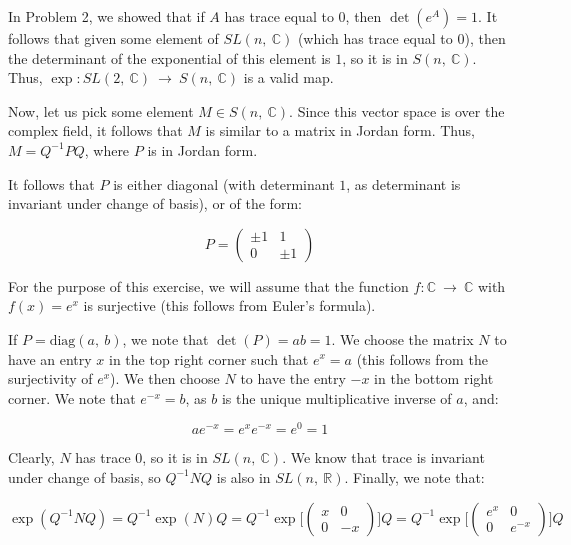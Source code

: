 \documentclass[10pt, oneside]{article}
\begin{document}
    In Problem 2, we showed that if $A$ has trace equal to $0$, then $\det(e^A) = 1$. It follows that given some element of $SL(n, \ \mathbb{C})$ (which has trace equal to $0$), then
    the determinant of the exponential of this element is $1$, so it is in $S(n, \ \mathbb{C})$. Thus, $\exp : SL(2, \ \mathbb{C}) \ \rightarrow \ S(n, \ \mathbb{C})$ is a valid map.
    \newline

    Now, let us pick some element $M \in S(n, \ \mathbb{C})$. Since this vector space is over the complex field, it follows that $M$ is similar to a matrix in Jordan form. Thus,
    $M = Q^{-1} P Q$, where $P$ is in Jordan form.
    \newline

    It follows that $P$ is either diagonal (with determinant $1$, as determinant is invariant under change of basis), or of the form:

    \begin{equation}
      P = \begin{pmatrix} \pm 1 & 1 \\ 0 & \pm 1 \end{pmatrix}
      \end{equation}

    For the purpose of this exercise, we will assume that the function $f : \mathbb{C} \ \rightarrow \ \mathbb{C}$ with $f(x) = e^x$ is surjective (this follows from
    Euler's formula).
    \newline

    If $P = \text{diag}(a, \ b)$, we note that $\det(P) = ab = 1$. We choose the matrix $N$ to have an entry $x$ in the top right corner such that $e^x = a$ (this follows from the
    surjectivity of $e^x$). We then choose $N$ to have the entry $-x$ in the bottom right corner. We note that $e^{-x} = b$, as $b$ is the unique multiplicative inverse of $a$, and:

    $$a e^{-x} = e^{x} e^{-x} = e^{0} = 1$$

    Clearly, $N$ has trace $0$, so it is in $SL(n, \ \mathbb{C})$. We know that trace is invariant under change of basis, so $Q^{-1} N Q$ is also in $SL(n, \ \mathbb{R})$. Finally, we
    note that:

    $$\exp(Q^{-1} N Q) = Q^{-1} \exp(N) Q = Q^{-1} \exp \Big[ \begin{pmatrix} x & 0 \\ 0 & -x \end{pmatrix} \Big] Q = Q^{-1} \exp \Big[ \begin{pmatrix} e^x & 0 \\ 0 & e^{-x} \end{pmatrix} \Big] Q$$
\end{document}
